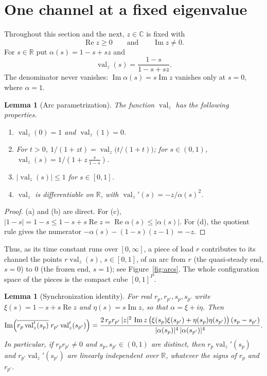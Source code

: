 \documentclass[11pt,a4paper]{article}
\theoremstyle{plain}
\newtheorem{lemma}[theorem]{Lemma}
\theoremstyle{definition}
\theoremstyle{remark}
\newcommand{\R}{\mathbb{R}}
\newcommand{\C}{\mathbb{C}}
\newcommand{\Real}{\operatorname{Re}}
\newcommand{\Imag}{\operatorname{Im}}
\newcommand{\val}{\operatorname{val}}
\begin{document}
\section{One channel at a fixed eigenvalue}\label{sec:channel}

Throughout this section and the next, $z\in\C$ is fixed with
\[
  \Real z\ge0\qquad\text{and}\qquad \Imag z\ne0 .
\]
For $s\in\R$ put $\alpha(s)=1-s+sz$ and
\[
  \val_z(s)=\frac{1-s}{1-s+sz}.
\]
The denominator never vanishes: $\Imag\alpha(s)=s\Imag z$ vanishes only at $s=0$, where
$\alpha=1$.

\begin{lemma}[Arc parametrization]\label{lem:arc}
The function $\val_z$ has the following properties.
\begin{enumerate}[label=(\alph*)]
  \item $\val_z(0)=1$ and $\val_z(1)=0$.
  \item For $t>0$, $1/(1+zt)=\val_z\bigl(t/(1+t)\bigr)$; for $s\in(0,1)$,
    $\val_z(s)=1/(1+z\,\tfrac{s}{1-s})$.
  \item $|\val_z(s)|\le1$ for $s\in[0,1]$.
  \item $\val_z$ is differentiable on $\R$, with $\val_z'(s)=-z/\alpha(s)^2$.
\end{enumerate}
\end{lemma}

\begin{proof}
(a) and (b) are direct. For (c), $|1-s|=1-s\le1-s+s\Real z=\Real\alpha(s)\le|\alpha(s)|$.
For (d), the quotient rule gives the numerator $-\alpha(s)-(1-s)(z-1)=-z$.
\end{proof}

Thus, as its time constant runs over $[0,\infty]$, a piece of load $r$ contributes to its
channel the points $r\val_z(s)$, $s\in[0,1]$, of an arc from $r$ (the quasi-steady end,
$s=0$) to $0$ (the frozen end, $s=1$); see Figure~\ref{fig:arcs}. The whole configuration
space of the pieces is the compact cube $[0,1]^P$.

\begin{lemma}[Synchronization identity]\label{lem:sync}
For real $r_p,r_{p'},s_p,s_{p'}$ write $\xi(s)=1-s+s\Real z$ and $\eta(s)=s\Imag z$, so that
$\alpha=\xi+i\eta$. Then
\[
  \Imag\Bigl(\overline{r_p\val_z'(s_p)}\;r_{p'}\val_z'(s_{p'})\Bigr)
  =\frac{2\,r_pr_{p'}\,|z|^2\,\Imag z\,\bigl(\xi(s_p)\xi(s_{p'})+\eta(s_p)\eta(s_{p'})\bigr)\,(s_p-s_{p'})}
        {|\alpha(s_p)|^4\,|\alpha(s_{p'})|^4}.
\]
In particular, if $r_pr_{p'}\ne0$ and $s_p,s_{p'}\in(0,1)$ are distinct, then
$r_p\val_z'(s_p)$ and $r_{p'}\val_z'(s_{p'})$ are linearly independent over $\R$, whatever
the signs of $r_p$ and $r_{p'}$.
\end{lemma}
\end{document}
